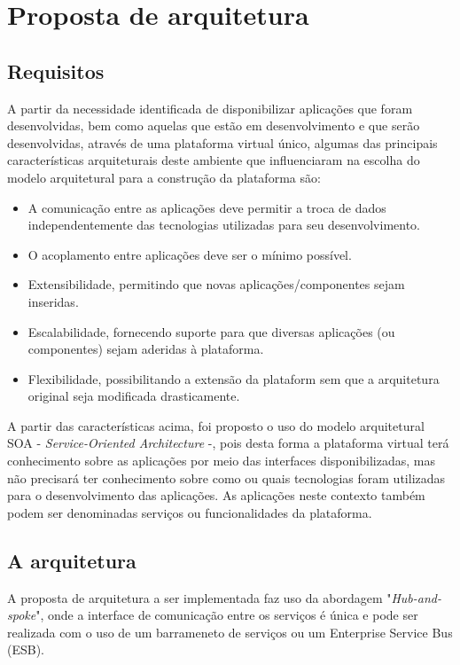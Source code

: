 \section{Proposta de arquitetura}

\subsection{Requisitos}
A partir da necessidade identificada de disponibilizar aplicações que foram desenvolvidas, bem como aquelas que estão em desenvolvimento e que serão desenvolvidas, através de uma plataforma virtual único, algumas das principais características arquiteturais deste ambiente que influenciaram na escolha do modelo arquitetural para a construção da plataforma são:

\begin{itemize}
\item A comunicação entre as aplicações deve permitir a troca de dados independentemente das tecnologias utilizadas para seu desenvolvimento.
\item O acoplamento entre aplicações deve ser o mínimo possível.
\item Extensibilidade, permitindo que novas aplicações/componentes sejam inseridas.
\item Escalabilidade, fornecendo suporte para que diversas aplicações (ou componentes) sejam aderidas à plataforma.
\item Flexibilidade,  possibilitando a extensão da plataform sem que a arquitetura original seja modificada drasticamente.
\end{itemize}

A partir das características acima, foi proposto o uso do modelo arquitetural SOA - \textit{Service-Oriented Architecture} -, pois desta forma a plataforma virtual terá conhecimento sobre as aplicações por meio das interfaces disponibilizadas, mas não precisará ter conhecimento sobre como ou quais tecnologias foram utilizadas para o desenvolvimento das aplicações. As aplicações neste contexto também podem ser denominadas serviços ou funcionalidades da plataforma.

\subsection{A arquitetura}

A proposta de arquitetura a ser implementada faz uso da abordagem "\textit{Hub-and-spoke}", onde a interface de comunicação entre os serviços é única e pode ser realizada com o uso de um barrameneto de serviços ou um Enterprise Service Bus (ESB).

